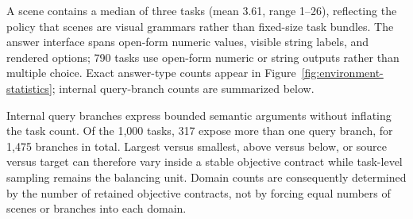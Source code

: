 A scene contains a median of three tasks (mean 3.61, range 1--26), reflecting
the policy that scenes are visual grammars rather than fixed-size task
bundles. The answer interface spans open-form numeric values, visible string
labels, and rendered options; 790 tasks use open-form numeric or string outputs
rather than multiple choice. Exact answer-type counts appear in
Figure~\ref{fig:environment-statistics}; internal query-branch counts are
summarized below.

Internal query branches express bounded semantic arguments without inflating
the task count. Of the 1,000 tasks, 317 expose more than one query
branch, for 1,475 branches in total.  Largest versus smallest, above versus
below, or source versus target can therefore vary inside a stable objective
contract while task-level sampling remains the balancing unit. Domain
counts are consequently determined by the number of retained objective
contracts, not by forcing equal numbers of scenes or branches into each
domain.
